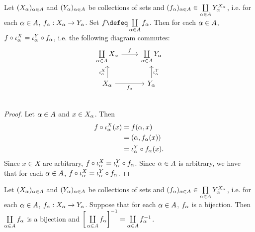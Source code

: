 \documentclass{book}
\begin{document}
	\begin{ex} 
		Let $(X_{\alpha})_{\alpha \in A}$ and $(Y_{\alpha})_{\alpha \in A}$ be collections of sets and $(f_{\alpha})_{\alpha \in A} \in \coprod\limits_{\alpha \in A} Y_{\alpha}^{X_{\alpha}}$, i.e. for each $\alpha \in A$, $f_{\alpha}:X_{\alpha} \rightarrow Y_{\alpha}$. Set $f \defeq \coprod\limits_{\al \in A} f_{\al}$. Then for each $\alpha \in A$, $f \circ \iota^X_{\alpha} = \iota^Y_{\alpha} \circ f_{\alpha}$, i.e. the following diagram commutes:
		\[ 
		\begin{tikzcd}
			\coprod\limits_{\al \in A} X_{\al}  \arrow[r, "f"]  & \coprod\limits_{\al \in A} Y_{\al} \\
			X_{\al} \arrow[u, "\iota^X_{\al}"] \arrow[r, "f_{\al}"'] &  Y_{\al} \arrow[u, "\iota^Y_{\al}"'] \\
		\end{tikzcd}
		\]
	\end{ex}

	\begin{proof}
		Let $\alpha \in A$ and $x \in X_{\alpha}$. Then
		\begin{align*}
			f \circ \iota^X_{\alpha}(x)
			& = f (\alpha, x) \\
			& = (\alpha, f_{\alpha}(x)) \\
			& = \iota^Y_{\alpha} \circ f_{\alpha}(x). 
		\end{align*}
		Since $x \in X$ are arbitrary, $f \circ \iota^X_{\alpha} = \iota^Y_{\alpha} \circ f_{\alpha}$. Since $\alpha \in A$ is arbitrary, we have that for each $\alpha \in A$, $f \circ \iota^X_{\alpha} = \iota^Y_{\alpha} \circ f_{\alpha}$.
	\end{proof}
	
	\begin{ex}  
		Let $(X_{\alpha})_{\alpha \in A}$ and $(Y_{\alpha})_{\alpha \in A}$ be collections of sets and $(f_{\alpha})_{\alpha \in A} \in \prod\limits_{\alpha \in A} Y_{\alpha}^{X_{\alpha}}$, i.e. for each $\alpha \in A$, $f_{\alpha}:X_{\alpha} \rightarrow Y_{\alpha}$. Suppose that for each $\alpha \in A$, $f_{\alpha}$ is a bijection. Then $\coprod\limits_{\alpha \in A} f_{\alpha}$ is a bijection and $\bigg[ \coprod\limits_{\alpha \in A} f_{\alpha} \bigg]^{-1} = \coprod\limits_{\alpha \in A} f_{\alpha}^{-1}$.
	\end{ex}
	
\end{document}
